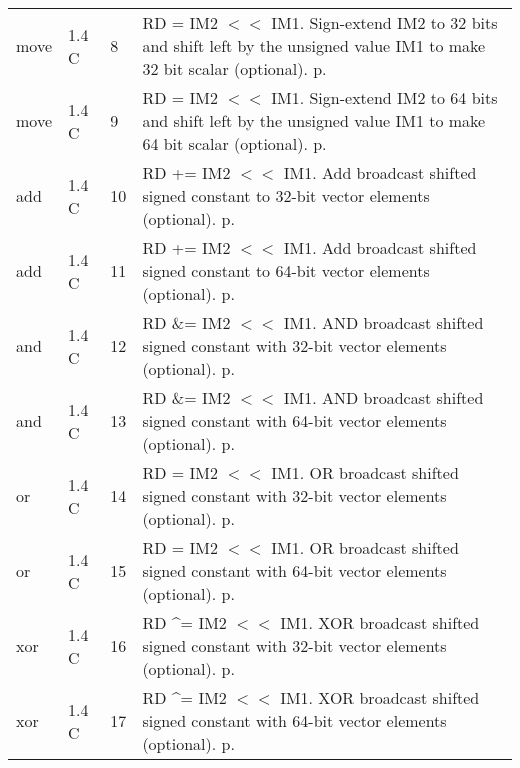 \documentclass[forwardcom.tex]{subfiles}
\begin{document}
\begin{longtable} {|p{25mm}|p{14mm}|p{10mm}|p{95mm}|}
move          & 1.4 C &  8 & RD = IM2 $<<$ IM1. Sign-extend IM2 to 32 bits and shift left by the unsigned value IM1 to make 32 bit scalar (optional). p. \pageref{table:moveInstruction} \\
move          & 1.4 C &  9 & RD = IM2 $<<$ IM1. Sign-extend IM2 to 64 bits and shift left by the unsigned value IM1 to make 64 bit scalar (optional). p. \pageref{table:moveInstruction} \\
add           & 1.4 C & 10 & RD += IM2 $<<$ IM1. Add broadcast shifted signed constant to 32-bit vector elements (optional). p. \pageref{table:addInstruction} \\
add           & 1.4 C & 11 & RD += IM2 $<<$ IM1. Add broadcast shifted signed constant to 64-bit vector elements (optional). p. \pageref{table:addInstruction} \\
and           & 1.4 C & 12 & RD \&= IM2 $<<$ IM1. AND broadcast shifted signed constant with 32-bit vector elements (optional). p. \pageref{table:andInstruction} \\
and           & 1.4 C & 13 & RD \&= IM2 $<<$ IM1. AND broadcast shifted signed constant with 64-bit vector elements (optional). p. \pageref{table:andInstruction} \\
or            & 1.4 C & 14 & RD \textbar{}= IM2 $<<$ IM1. OR broadcast shifted signed constant with 32-bit vector elements (optional). p. \pageref{table:orInstruction} \\
or            & 1.4 C & 15 & RD \textbar{}= IM2 $<<$ IM1. OR broadcast shifted signed constant with 64-bit vector elements (optional). p. \pageref{table:orInstruction} \\
xor           & 1.4 C & 16 & RD \^{}= IM2 $<<$ IM1. XOR broadcast shifted signed constant with 32-bit vector elements (optional). p. \pageref{table:xorInstruction} \\
xor           & 1.4 C & 17 & RD \^{}= IM2 $<<$ IM1. XOR broadcast shifted signed constant with 64-bit vector elements (optional). p. \pageref{table:xorInstruction} \\


\end{longtable}
\end{document}
